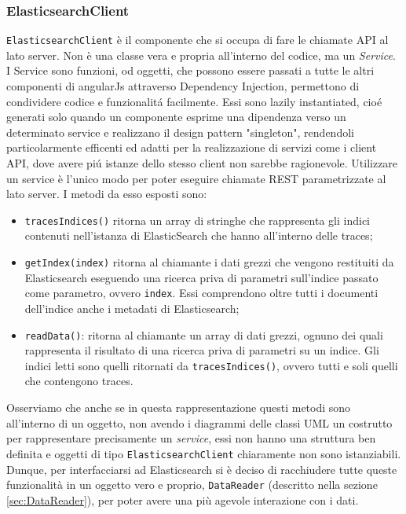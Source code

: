 \subsubsection{ElasticsearchClient} 
\texttt{ElasticsearchClient} è il componente che si occupa di fare le chiamate API al lato server. Non è una classe vera e propria all'interno del codice, ma un \emph{Service}. 
I Service sono funzioni, od oggetti, che possono essere passati a tutte le altri componenti di angularJs attraverso Dependency Injection, permettono di condividere codice e funzionalitá facilmente. Essi sono lazily instantiated, cioé generati solo quando un componente esprime una dipendenza verso un determinato service e realizzano il design pattern "singleton", rendendoli particolarmente efficenti ed adatti per la realizzazione di servizi come i client API, dove avere piú istanze dello stesso client non sarebbe ragionevole.
Utilizzare un service è l'unico modo per poter eseguire chiamate REST parametrizzate al lato server. I metodi da esso esposti sono: 
\begin{itemize} 
  \item \texttt{tracesIndices()} ritorna un array di stringhe che rappresenta gli indici contenuti nell'istanza di ElasticSearch che hanno all'interno delle traces; 
  \item \texttt{getIndex(index)} ritorna al chiamante i dati grezzi che vengono restituiti da Elasticsearch eseguendo una ricerca priva di parametri sull'indice passato come parametro, ovvero \texttt{index}. Essi comprendono oltre tutti i documenti dell'indice anche i metadati di Elasticsearch; 
  \item \texttt{readData()}: ritorna al chiamante un array di dati grezzi, ognuno dei quali rappresenta il risultato di una ricerca priva di parametri su un indice. Gli indici letti sono quelli ritornati da \texttt{tracesIndices()}, ovvero tutti e soli quelli che contengono traces. 
\end{itemize} 
Osserviamo che anche se in questa rappresentazione questi metodi sono all'interno di un oggetto, non avendo i diagrammi delle classi UML un costrutto per rappresentare precisamente un \emph{service}, essi non hanno una struttura ben definita e oggetti di tipo \texttt{ElasticsearchClient} chiaramente non sono istanziabili. Dunque, per interfacciarsi ad Elasticsearch si è deciso di racchiudere tutte queste funzionalità in un oggetto vero e proprio, \texttt{DataReader} (descritto nella sezione \ref{sec:DataReader}), per poter avere una più agevole interazione con i dati. 
 

